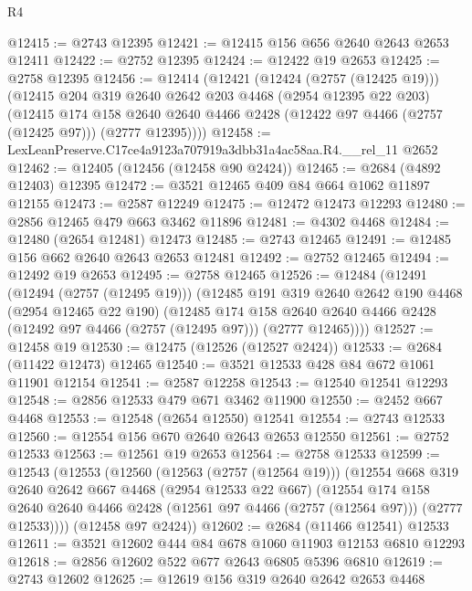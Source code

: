 \begin{lexlean}{R4}
\begin{coremodule}
@12415 := @2743 @12395
@12421 := @12415 @156 @656 @2640 @2643 @2653 @12411
@12422 := @2752 @12395
@12424 := @12422 @19 @2653
@12425 := @2758 @12395
@12456 := @12414
    (@12421
      (@12424 (@2757 (@12425 @19)))
      (@12415
        @204
        @319
        @2640
        @2642
        @203
        @4468
        (@2954 @12395 @22 @203)
        (@12415
          @174
          @158
          @2640
          @2640
          @4466
          @2428
          (@12422 @97 @4466 (@2757 (@12425 @97)))
          (@2777 @12395))))
@12458 := LexLeanPreserve.C17ce4a9123a707919a3dbb31a4ac58aa.R4.__rel_11 @2652
@12462 := @12405 (@12456 (@12458 @90 @2424))
@12465 := @2684 (@4892 @12403) @12395
@12472 := @3521 @12465 @409 @84 @664 @1062 @11897 @12155
@12473 := @2587 @12249
@12475 := @12472 @12473 @12293
@12480 := @2856 @12465 @479 @663 @3462 @11896
@12481 := @4302 @4468
@12484 := @12480 (@2654 @12481) @12473
@12485 := @2743 @12465
@12491 := @12485 @156 @662 @2640 @2643 @2653 @12481
@12492 := @2752 @12465
@12494 := @12492 @19 @2653
@12495 := @2758 @12465
@12526 := @12484
    (@12491
      (@12494 (@2757 (@12495 @19)))
      (@12485
        @191
        @319
        @2640
        @2642
        @190
        @4468
        (@2954 @12465 @22 @190)
        (@12485
          @174
          @158
          @2640
          @2640
          @4466
          @2428
          (@12492 @97 @4466 (@2757 (@12495 @97)))
          (@2777 @12465))))
@12527 := @12458 @19
@12530 := @12475 (@12526 (@12527 @2424))
@12533 := @2684 (@11422 @12473) @12465
@12540 := @3521 @12533 @428 @84 @672 @1061 @11901 @12154
@12541 := @2587 @12258
@12543 := @12540 @12541 @12293
@12548 := @2856 @12533 @479 @671 @3462 @11900
@12550 := @2452 @667 @4468
@12553 := @12548 (@2654 @12550) @12541
@12554 := @2743 @12533
@12560 := @12554 @156 @670 @2640 @2643 @2653 @12550
@12561 := @2752 @12533
@12563 := @12561 @19 @2653
@12564 := @2758 @12533
@12599 := @12543
    (@12553
      (@12560
        (@12563 (@2757 (@12564 @19)))
        (@12554
          @668
          @319
          @2640
          @2642
          @667
          @4468
          (@2954 @12533 @22 @667)
          (@12554
            @174
            @158
            @2640
            @2640
            @4466
            @2428
            (@12561 @97 @4466 (@2757 (@12564 @97)))
            (@2777 @12533))))
      (@12458 @97 @2424))
@12602 := @2684 (@11466 @12541) @12533
@12611 := @3521 @12602 @444 @84 @678 @1060 @11903 @12153 @6810 @12293
@12618 := @2856 @12602 @522 @677 @2643 @6805 @5396 @6810
@12619 := @2743 @12602
@12625 := @12619 @156 @319 @2640 @2642 @2653 @4468

\end{coremodule}
\end{lexlean}
